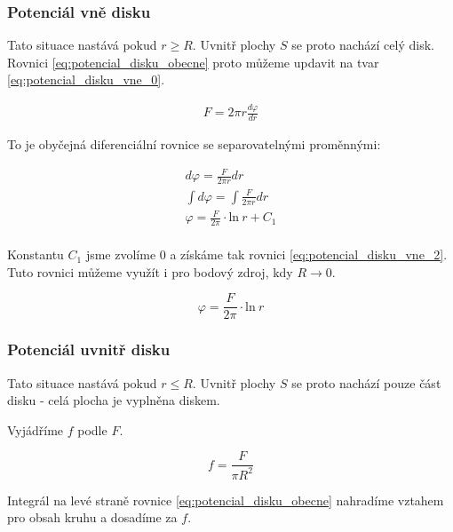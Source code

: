 \documentclass{book}
\begin{document}
\subsubsection{Potenciál vně disku}

Tato situace nastává pokud \(r \geq R\). Uvnitř plochy \(S\) se proto nachází celý disk. Rovnici \eqref{eq:potencial_disku_obecne} proto můžeme updavit na tvar \eqref{eq:potencial_disku_vne_0}.

\begin{equation}
\label{eq:potencial_disku_vne_0}
\begin{split}
F = 2 \pi r \frac{d \varphi}{dr}
\end{split}
\end{equation}

To je obyčejná diferenciální rovnice se separovatelnými proměnnými:

\begin{equation}
\label{eq:potencial_disku_vne_1}
\begin{split}
d \varphi = \frac{F}{2 \pi r} dr \\
\int d \varphi = \int \frac{F}{2 \pi r} dr \\
\varphi = \frac{F}{2 \pi} \cdot \mathrm{ln} \ r + C_1 \\
\end{split}
\end{equation}

Konstantu \(C_1\) jsme zvolíme 0 a získáme tak rovnici \eqref{eq:potencial_disku_vne_2}. Tuto rovnici můžeme využít i pro bodový zdroj, kdy \(R \rightarrow 0\).

\begin{equation}
\label{eq:potencial_disku_vne_2}
\varphi = \frac{F}{2 \pi} \cdot \mathrm{ln} \ r
\end{equation}

\subsubsection{Potenciál uvnitř disku}

Tato situace nastává pokud \(r \leq R\). Uvnitř plochy \(S\) se proto nachází pouze část disku - celá plocha je vyplněna diskem.

Vyjádříme \(f\) podle \(F\).

\begin{equation}
f = \frac{F}{\pi R^2}
\end{equation}

Integrál na levé straně rovnice \eqref{eq:potencial_disku_obecne} nahradíme vztahem pro obsah kruhu a dosadíme za \(f\).
\end{document}
